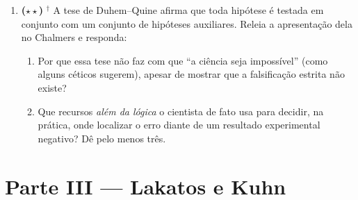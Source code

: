 \documentclass[10pt,a4paper]{extarticle}
\newcommand{\impt}[1]{\textcolor{important}{#1}}
\newcommand{\livro}{\textcolor{notice}{$^{\dagger}$}}
\newcommand{\difii}{$\star\star$}
\begin{document}
\begin{enumerate}[label=\textbf{\arabic*.}, leftmargin=*, start=5]
\begin{enumerate}[label=(\alph*)]
    \item O argumento contém ao menos dois deslizes conceituais sérios. Identifique-os.
    \item Reformule a crítica de modo que ela faça sentido. (Há de fato uma dificuldade real escondida aqui, mas a versão acima não a captura.)
\end{enumerate}

\item \textbf{(\difii)} \livro{} A tese de \impt{Duhem--Quine} afirma que toda hipótese é testada em conjunto com um conjunto de hipóteses auxiliares. Releia a apresentação dela no Chalmers e responda:

\begin{enumerate}[label=(\alph*)]
    \item Por que essa tese não faz com que ``a ciência seja impossível'' (como alguns céticos sugerem), apesar de mostrar que a falsificação estrita não existe?
    \item Que recursos \emph{além da lógica} o cientista de fato usa para decidir, na prática, onde localizar o erro diante de um resultado experimental negativo? Dê pelo menos três.
\end{enumerate}

\end{enumerate}

\section*{Parte III --- Lakatos e Kuhn}
\end{document}
